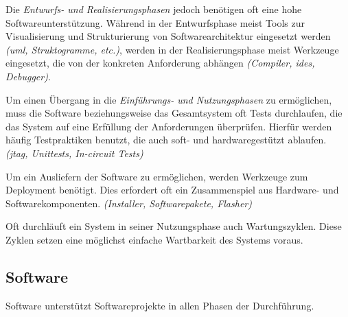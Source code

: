 Die \emph{Entwurfs- und Realisierungsphasen} jedoch benötigen oft eine hohe
Softwareunterstützung. Während in der Entwurfsphase meist Tools zur
Visualisierung und Strukturierung von Softwarearchitektur eingesetzt werden
\emph{(\gls{uml}, Struktogramme, etc.)}, werden in der Realisierungsphase
meist Werkzeuge eingesetzt, die von der konkreten Anforderung abhängen
\emph{(Compiler, \glspl{ide}, Debugger)}.

Um einen Übergang in die \emph{Einführungs- und Nutzungsphasen} zu ermöglichen,
muss die Software beziehungsweise das Gesamtsystem oft Tests durchlaufen, die das
System auf eine Erfüllung der Anforderungen überprüfen. Hierfür werden
häufig Testpraktiken benutzt, die auch soft- und hardwaregestützt
ablaufen. \emph{(\gls{jtag}, Unittests, In-circuit Tests)}

Um ein Ausliefern der Software zu ermöglichen, werden Werkzeuge zum Deployment
benötigt. Dies erfordert oft ein Zusammenspiel aus Hardware-
und Softwarekomponenten. \emph{(Installer, Softwarepakete, Flasher)}

Oft durchläuft ein System in seiner Nutzungsphase auch Wartungszyklen.
Diese Zyklen setzen eine möglichst einfache Wartbarkeit des Systems voraus.

\subsection{Software}\label{sub:software}
Software unterstützt Softwareprojekte in allen Phasen der Durchführung.


